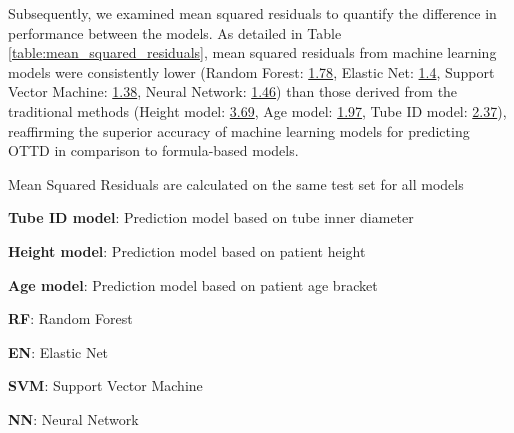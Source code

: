 \documentclass[11pt]{article}
\begin{document}
Subsequently, we examined mean squared residuals to quantify the difference in performance between the models. As detailed in Table \ref{table:mean_squared_residuals}, mean squared residuals from machine learning models were consistently lower (Random Forest: \hyperlink{B0a}{1.78}, Elastic Net: \hyperlink{B1a}{1.4}, Support Vector Machine: \hyperlink{B2a}{1.38}, Neural Network: \hyperlink{B3a}{1.46}) than those derived from the traditional methods (Height model: \hyperlink{B4a}{3.69}, Age model: \hyperlink{B5a}{1.97}, Tube ID model: \hyperlink{B6a}{2.37}), reaffirming the superior accuracy of machine learning models for predicting OTTD in comparison to formula-based models.

\begin{table}[h]
\caption{\protect\hyperlink{file-table-2-pkl}{Mean Squared Residuals for each model}}
\label{table:mean_squared_residuals}
\begin{threeparttable}
\renewcommand{\TPTminimum}{\linewidth}
\begin{tablenotes}
\footnotesize
\item Mean Squared Residuals are calculated on the same test set for all models
\item \textbf{Tube ID model}: Prediction model based on tube inner diameter
\item \textbf{Height model}: Prediction model based on patient height
\item \textbf{Age model}: Prediction model based on patient age bracket
\item \textbf{RF}: Random Forest
\item \textbf{EN}: Elastic Net
\item \textbf{SVM}: Support Vector Machine
\item \textbf{NN}: Neural Network
\end{tablenotes}
\end{threeparttable}
\end{table}
\end{document}
